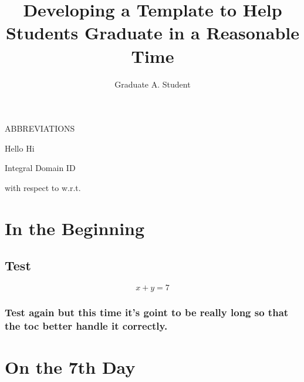 \documentclass{csm-thesis}
\title{Developing a \ce{^{227}_{90}Th+} Template to Help Students Graduate in a Reasonable Time}
\author{Graduate A. Student}
\begin{document}
\maketitle
\newpage

\makecopyright{\the\year}
\newpage

\makesubmittal
\newpage

\begin{abstract}
\lipsum[1-4]
\end{abstract}


\newpage

\tableofcontents
\newpage

\listoftables
\newpage

\listoffigures
\newpage

\begin{center}
  ABBREVIATIONS
\end{center}

Hello \dotfill Hi

Integral Domain \dotfill ID

with respect to \dotfill w.r.t.

\newpage


\chapter{In the Beginning}
\lipsum[5]

\section{Test}

\begin{equation}
x+y=7
\end{equation}

\lipsum[6-8]

\subsection{Test again but this time it's goint to be really long so that the toc better handle it correctly.}

\lipsum[9-11]

\lipsum[12-13]

\chapter{On the 7th Day}
\end{document}

